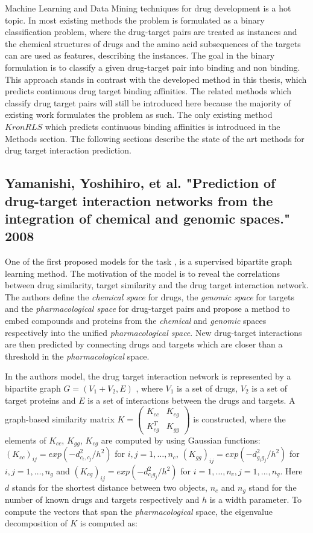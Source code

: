 Machine Learning and Data Mining techniques for drug development is a hot topic. In most existing methods the problem is formulated as a binary classification problem, where the drug-target pairs are treated as instances and the chemical structures of drugs and the amino acid subsequences of the targets can are used as features, describing the instances. The goal in the binary formulation is to classify a given drug-target pair into binding and non binding. This approach stands in contrast with the developed method in this thesis, which predicts continuous drug target binding affinities. The related methods which classify drug target pairs will still be introduced here because the majority of existing work formulates the problem as such. The only existing method $KronRLS$ which predicts continuous binding affinities is introduced in the Methods section. The following sections describe the state of the art methods for drug target interaction prediction.

\subsection{Yamanishi, Yoshihiro, et al. "Prediction of drug-target interaction networks from the integration of chemical and genomic spaces." 2008}

One of the first proposed models for the task \cite{yamanishi2008prediction}, is a supervised bipartite graph learning method. The motivation of the model is to reveal the correlations between drug similarity, target similarity and the drug target interaction network. The authors define the \textit{chemical space} for drugs, the \textit{genomic space} for targets and the \textit{pharmacological space} for drug-target pairs and propose a method to embed compounds and proteins from the \textit{chemical} and \textit{genomic} spaces respectively into the unified \textit{pharmacological space}. New drug-target interactions are then predicted by connecting drugs and targets which are closer than a threshold in the \textit{pharmacological} space. 

In the authors model, the drug target interaction network is represented by a bipartite graph $G=(V_1+V_2, E)$ , where $V_1$ is a set of drugs, $V_2$ is a set of target proteins and $E$ is a set of interactions between the drugs and targets. A graph-based similarity matrix 
$ K = \begin{pmatrix}

K_{cc} & K_{cg} \\
K_{cg}^T & K_{gg}
\end{pmatrix}
$
is constructed, where the elements of $K_{cc}$, $K_{gg}$, $K_{cg}$ are computed by using Gaussian functions:
$(K_{cc})_{ij}=exp(-d^2_{c_i,c_j}/h^2)$ for $i,j=1,\dots,n_c$, $(K_{gg})_{ij}=exp(-d^2_{g_ig_j}/h^2)$ for $i,j=1,\dots,n_g$ and $(K_{cg})_{ij} = exp(-d^2_{c_ig_j}/h^2)$ for $i=1,\dots,n_c, j=1,\dots,n_g$. Here $d$ stands for the shortest distance between two objects,  $n_c$ and $n_g$ stand for the number of known drugs and targets respectively and $h$ is a width parameter. 
To compute the vectors that span the \textit{pharmacological} space, the eigenvalue decomposition of $K$ is computed as:

